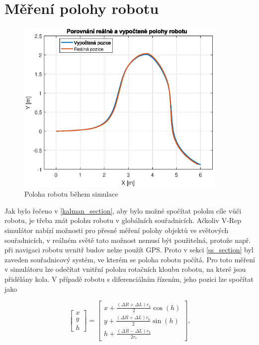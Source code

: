 \documentclass[twoside]{ctuthesis}
\theoremstyle{plain}
\theoremstyle{definition}
\theoremstyle{note}
\begin{document}
\section{Měření polohy robotu}

\begin{figure}
	\caption{Poloha robotu během simulace}
	
	\label{rob_pos}
	\includegraphics[width=0.9\textwidth]{images/5/pos_rob.eps}
\end{figure}

Jak bylo řečeno v \ref{kalman_section}, aby bylo možné spočítat polohu cíle vůči robotu, je třeba znát polohu robotu v globálních souřadnicích. Ačkoliv V-Rep simulátor nabízí možnosti pro přesné měření polohy objektů ve světových souřadnicích, v reálném světě tato možnost nemusí být použitelná, protože např. při navigaci robotu uvnitř budov nelze použít GPS. Proto v sekci \ref{ss_section} byl zaveden souřadnicový systém, ve kterém se poloha robotu počítá. Pro toto měření v simulátoru lze odečítat vnitřní polohu rotačních kloubu robotu, na které jsou přidělány kola. V případě robotu s diferenciálním řízením, jeho pozici lze spočítat jako

\begin{equation}
\begin{bmatrix}
x\\
y\\
h
\end{bmatrix} = 
\begin{bmatrix}
x + \frac{(\Delta R + \Delta L)r_{k}}{2}\cos(h)\\
y + \frac{(\Delta R + \Delta L)r_{k}}{2}\sin(h)\\
h + \frac{(\Delta R - \Delta L)r_k}{2r_r}
\end{bmatrix},
\end{equation}
\end{document}
